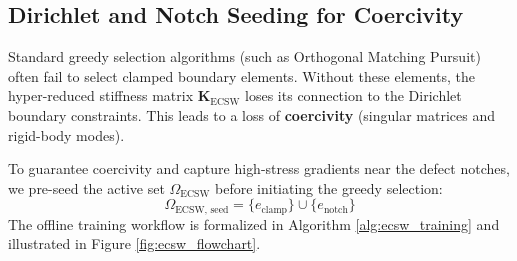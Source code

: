 \subsection{Dirichlet and Notch Seeding for Coercivity}
Standard greedy selection algorithms (such as Orthogonal Matching Pursuit) often fail to select clamped boundary elements. Without these elements, the hyper-reduced stiffness matrix $\mathbf{K}_{\text{ECSW}}$ loses its connection to the Dirichlet boundary constraints. This leads to a loss of \textbf{coercivity} (singular matrices and rigid-body modes). 

To guarantee coercivity and capture high-stress gradients near the defect notches, we pre-seed the active set $\Omega_{\text{ECSW}}$ before initiating the greedy selection:
\begin{equation}
    \Omega_{\text{ECSW, seed}} = \{e_{\text{clamp}}\} \cup \{e_{\text{notch}}\}
\end{equation}
The offline training workflow is formalized in Algorithm \ref{alg:ecsw_training} and illustrated in Figure \ref{fig:ecsw_flowchart}.


